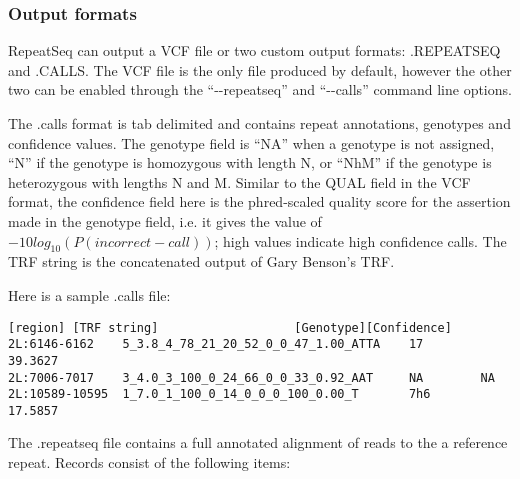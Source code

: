 \documentclass[11pt]{article}
\begin{document}
\subsubsection {Output formats}
RepeatSeq can output a VCF file or two custom output formats: .REPEATSEQ and .CALLS. The VCF file is the only file produced by default, however the other two can be enabled through the “{-}{-}repeatseq” and “{-}{-}calls” command line options.

The .calls format is tab delimited and contains repeat annotations, genotypes and confidence values. The genotype field is “NA” when a genotype is not assigned, “N” if the genotype is homozygous with length N, or “NhM” if the genotype is heterozygous with lengths N and M. Similar to the QUAL field in the VCF format, the confidence field here is the phred-scaled quality score for the assertion made in the genotype field, i.e. it gives the value of $-10log_{10} ( P(incorrect-call ))$; high values indicate high confidence calls. The TRF string is the concatenated output of Gary Benson's TRF.

Here is a sample .calls file:

\begin{verbatim}
[region] [TRF string]			        [Genotype][Confidence]
2L:6146-6162    5_3.8_4_78_21_20_52_0_0_47_1.00_ATTA    17        39.3627
2L:7006-7017    3_4.0_3_100_0_24_66_0_0_33_0.92_AAT     NA        NA
2L:10589-10595  1_7.0_1_100_0_14_0_0_0_100_0.00_T       7h6       17.5857
\end{verbatim}

The .repeatseq file contains a full annotated alignment of reads to the a reference repeat. Records consist of the following items:
\end{document}

